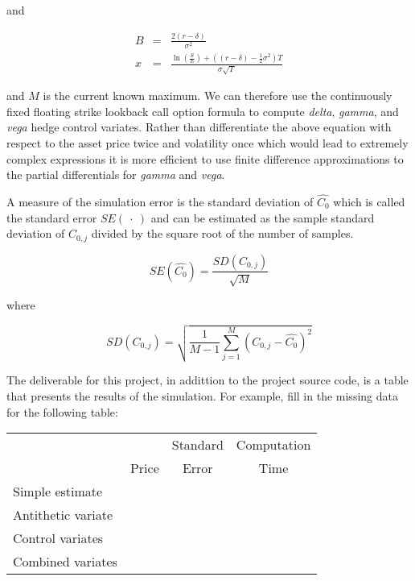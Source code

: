 \documentclass[11pt]{article}
\begin{document}
\medskip
and

\medskip
\begin{eqnarray*}
B &=& \frac{2(r - \delta)}{\sigma^{2}} \\
x &=& \frac{\ln{\left(\frac{S}{E}\right)} + \left((r-\delta) - \frac{1}{2}\sigma^{2} \right)T}{\sigma \sqrt{T}}
\end{eqnarray*}

\medskip
and $M$ is the current known maximum. We can therefore use the continuously fixed floating strike lookback
call option formula to compute \textit{delta}, \textit{gamma}, and \textit{vega} hedge control variates.
Rather than differentiate the above equation with respect to the asset price twice and volatility once
which would lead to extremely complex expressions it is more efficient to use finite difference approximations
to the partial differentials for \textit{gamma} and \textit{vega}.

\bigskip
\bigskip
A measure of the simulation error is the standard deviation of $\hat{C_{0}}$ which is called the standard error $SE(\: \cdot \:)$
and can be estimated as the sample standard deviation of $C_{0,j}$ divided by the square root of the number of
samples.

\medskip
\begin{equation*}
SE(\hat{C_{0}}) = \frac{SD(C_{0,j})}{\sqrt{M}}
\end{equation*}

\medskip
where

\medskip
\begin{equation*}
SD(C_{0,j}) = \sqrt{\frac{1}{M-1} \sum\limits_{j=1}^{M} (C_{0,j} - \hat{C_{0}})^{2}}
\end{equation*}

\newpage
The deliverable for this project, in addittion to the project source code, is a table that presents the results
of the simulation.  For example, fill in the missing data for the following table:



\bigskip
\begin{table}[h!]
\centering
\begin{tabular}{lc|c|c}
\hline
\hline
                              &                            & Standard & Computation \\
                              & Price \phantom{            } & Error    & Time        \\
                               \hline
Simple estimate               & &          &                      \\
Antithetic variate       & &          &                      \\
Control variates         & &          &                      \\
Combined variates             & &          &                      \\                               
                                                              
\hline
\hline
\end{tabular}
\end{table}
\end{document}
